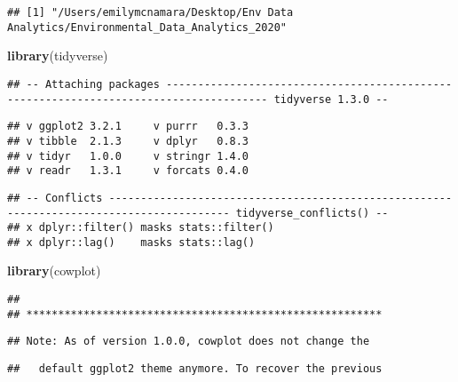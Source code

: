 \documentclass[]{article}
\newenvironment{Shaded}{\begin{snugshade}}{\end{snugshade}}
\newcommand{\KeywordTok}[1]{\textcolor[rgb]{0.13,0.29,0.53}{\textbf{#1}}}
\newcommand{\CommentTok}[1]{\textcolor[rgb]{0.56,0.35,0.01}{\textit{#1}}}
\newcommand{\NormalTok}[1]{#1}
\begin{document}
\begin{Shaded}
\end{Shaded}

\begin{verbatim}
## [1] "/Users/emilymcnamara/Desktop/Env Data Analytics/Environmental_Data_Analytics_2020"
\end{verbatim}

\begin{Shaded}
\begin{Highlighting}[]
\KeywordTok{library}\NormalTok{(tidyverse)}
\end{Highlighting}
\end{Shaded}

\begin{verbatim}
## -- Attaching packages -------------------------------------------------------------------------------------- tidyverse 1.3.0 --
\end{verbatim}

\begin{verbatim}
## v ggplot2 3.2.1     v purrr   0.3.3
## v tibble  2.1.3     v dplyr   0.8.3
## v tidyr   1.0.0     v stringr 1.4.0
## v readr   1.3.1     v forcats 0.4.0
\end{verbatim}

\begin{verbatim}
## -- Conflicts ----------------------------------------------------------------------------------------- tidyverse_conflicts() --
## x dplyr::filter() masks stats::filter()
## x dplyr::lag()    masks stats::lag()
\end{verbatim}

\begin{Shaded}
\begin{Highlighting}[]
\KeywordTok{library}\NormalTok{(cowplot)}
\end{Highlighting}
\end{Shaded}

\begin{verbatim}
## 
## ********************************************************
\end{verbatim}

\begin{verbatim}
## Note: As of version 1.0.0, cowplot does not change the
\end{verbatim}

\begin{verbatim}
##   default ggplot2 theme anymore. To recover the previous
\end{verbatim}
\end{document}
